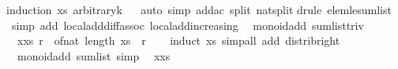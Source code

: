 \begin{isabellebody}
%
\isadelimproof
%
\endisadelimproof
%
\isatagproof
{}\isamarkupfalse%
{\isacharparenleft}{\kern0pt}induction\ xs\ arbitrary{\isacharcolon}{\kern0pt}k{\isacharparenright}{\kern0pt}\isanewline
\ \isamarkupfalse%
\ {\isacharparenleft}{\kern0pt}auto\ simp{\isacharcolon}{\kern0pt}\ add{\isacharunderscore}{\kern0pt}ac\ split{\isacharcolon}{\kern0pt}\ nat{\isachardot}{\kern0pt}split{\isacharparenright}{\kern0pt}\isanewline
{}\isamarkupfalse%
{\isacharparenleft}{\kern0pt}drule\ elem{\isacharunderscore}{\kern0pt}le{\isacharunderscore}{\kern0pt}sum{\isacharunderscore}{\kern0pt}list{\isacharparenright}{\kern0pt}\isanewline
{}\isamarkupfalse%
\ {\isacharparenleft}{\kern0pt}simp\ add{\isacharcolon}{\kern0pt}\ local{\isachardot}{\kern0pt}add{\isacharunderscore}{\kern0pt}diff{\isacharunderscore}{\kern0pt}assoc\ local{\isachardot}{\kern0pt}add{\isacharunderscore}{\kern0pt}increasing{\isacharparenright}{\kern0pt}%
\endisatagproof
{\isafoldproof}%
%
\isadelimproof
\isanewline
%
\endisadelimproof
\isanewline
{}\isamarkupfalse%
\ {\isacharparenleft}{\kern0pt}\ monoid{\isacharunderscore}{\kern0pt}add{\isacharparenright}{\kern0pt}\ sum{\isacharunderscore}{\kern0pt}list{\isacharunderscore}{\kern0pt}triv{\isacharcolon}{\kern0pt}\isanewline
\ \ {\isachardoublequoteopen}{\isacharparenleft}{\kern0pt}{\isasymSum}x{\isasymleftarrow}xs{\isachardot}{\kern0pt}\ r{\isacharparenright}{\kern0pt}\ {\isacharequal}{\kern0pt}\ of{\isacharunderscore}{\kern0pt}nat\ {\isacharparenleft}{\kern0pt}length\ xs{\isacharparenright}{\kern0pt}\ {\isacharasterisk}{\kern0pt}\ r{\isachardoublequoteclose}\isanewline
%
\isadelimproof
\ \ %
\endisadelimproof
%
\isatagproof
{}\isamarkupfalse%
\ {\isacharparenleft}{\kern0pt}induct\ xs{\isacharparenright}{\kern0pt}\ {\isacharparenleft}{\kern0pt}simp{\isacharunderscore}{\kern0pt}all\ add{\isacharcolon}{\kern0pt}\ distrib{\isacharunderscore}{\kern0pt}right{\isacharparenright}{\kern0pt}%
\endisatagproof
{\isafoldproof}%
%
\isadelimproof
\isanewline
%
\endisadelimproof
\isanewline
{}\isamarkupfalse%
\ {\isacharparenleft}{\kern0pt}\ monoid{\isacharunderscore}{\kern0pt}add{\isacharparenright}{\kern0pt}\ sum{\isacharunderscore}{\kern0pt}list{\isacharunderscore}{\kern0pt}{}\ {\isacharbrackleft}{\kern0pt}simp{\isacharbrackright}{\kern0pt}{\isacharcolon}{\kern0pt}\isanewline
\ \ {\isachardoublequoteopen}{\isacharparenleft}{\kern0pt}{\isasymSum}x{\isasymleftarrow}xs{\isachardot}{\kern0pt}\ {}{\isacharparenright}{\kern0pt}\ {\isacharequal}{\kern0pt}\ {}{\isachardoublequoteclose}\isanewline

\end{isabellebody}
